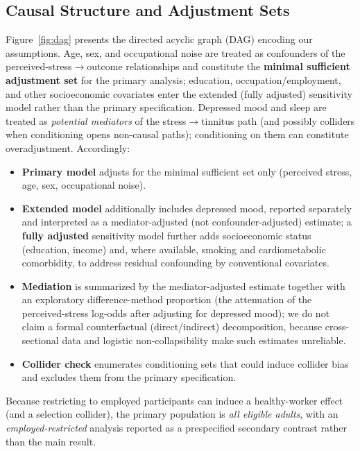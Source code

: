 \subsection{Causal Structure and Adjustment Sets}
Figure~\ref{fig:dag} presents the directed acyclic graph (DAG) encoding our assumptions. Age, sex, and occupational noise are treated as confounders of the perceived-stress$\rightarrow$outcome relationships and constitute the \textbf{minimal sufficient adjustment set} for the primary analysis; education, occupation/employment, and other socioeconomic covariates enter the extended (fully adjusted) sensitivity model rather than the primary specification. Depressed mood and sleep are treated as \emph{potential mediators} of the stress$\rightarrow$tinnitus path (and possibly colliders when conditioning opens non-causal paths); conditioning on them can constitute overadjustment. Accordingly:
\begin{itemize}[leftmargin=1.4em,itemsep=1pt]
\item \textbf{Primary model} adjusts for the minimal sufficient set only (perceived stress, age, sex, occupational noise).
\item \textbf{Extended model} additionally includes depressed mood, reported separately and interpreted as a mediator-adjusted (not confounder-adjusted) estimate; a \textbf{fully adjusted} sensitivity model further adds socioeconomic status (education, income) and, where available, smoking and cardiometabolic comorbidity, to address residual confounding by conventional covariates.
\item \textbf{Mediation} is summarized by the mediator-adjusted estimate together with an exploratory difference-method proportion (the attenuation of the perceived-stress log-odds after adjusting for depressed mood); we do not claim a formal counterfactual (direct/indirect) decomposition, because cross-sectional data and logistic non-collapsibility make such estimates unreliable.
\item \textbf{Collider check} enumerates conditioning sets that could induce collider bias and excludes them from the primary specification.
\end{itemize}
Because restricting to employed participants can induce a healthy-worker effect (and a selection collider), the primary population is \emph{all eligible adults}, with an \emph{employed-restricted} analysis reported as a prespecified secondary contrast rather than the main result.

